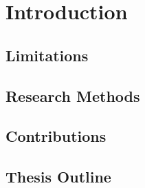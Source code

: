 \chapter{Introduction}\label{introduction}




\section{Limitations}
\section{Research Methods}
\section{Contributions}
\section{Thesis Outline}

